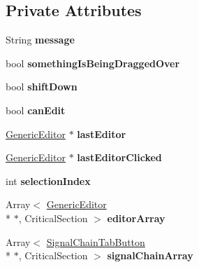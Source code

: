 \subsection*{Private Attributes}
\begin{DoxyCompactItemize}
\item 
\hypertarget{classEditorViewport_aebcce72fe2d98eed5690cdea87bbd776}{String {\bfseries message}}\label{classEditorViewport_aebcce72fe2d98eed5690cdea87bbd776}

\item 
\hypertarget{classEditorViewport_a152689484821c227a7909c6087b41e6c}{bool {\bfseries something\-Is\-Being\-Dragged\-Over}}\label{classEditorViewport_a152689484821c227a7909c6087b41e6c}

\item 
\hypertarget{classEditorViewport_a04fad22528a1dd4d5d68fd6cec4d0dd4}{bool {\bfseries shift\-Down}}\label{classEditorViewport_a04fad22528a1dd4d5d68fd6cec4d0dd4}

\item 
\hypertarget{classEditorViewport_ada0e62d14a51a7ffda1e396a5b66061c}{bool {\bfseries can\-Edit}}\label{classEditorViewport_ada0e62d14a51a7ffda1e396a5b66061c}

\item 
\hypertarget{classEditorViewport_aa4e7f71ad4823d393a489853d2760ba8}{\hyperlink{classGenericEditor}{Generic\-Editor} $\ast$ {\bfseries last\-Editor}}\label{classEditorViewport_aa4e7f71ad4823d393a489853d2760ba8}

\item 
\hypertarget{classEditorViewport_a7964a4d304213a3d5a40c3f7ea48257e}{\hyperlink{classGenericEditor}{Generic\-Editor} $\ast$ {\bfseries last\-Editor\-Clicked}}\label{classEditorViewport_a7964a4d304213a3d5a40c3f7ea48257e}

\item 
\hypertarget{classEditorViewport_a4b8c16b1db82e6f7949be357ee9ce644}{int {\bfseries selection\-Index}}\label{classEditorViewport_a4b8c16b1db82e6f7949be357ee9ce644}

\item 
\hypertarget{classEditorViewport_afb84ce94749157028397417b95b70aba}{Array$<$ \hyperlink{classGenericEditor}{Generic\-Editor} \\*
$\ast$, Critical\-Section $>$ {\bfseries editor\-Array}}\label{classEditorViewport_afb84ce94749157028397417b95b70aba}

\item 
\hypertarget{classEditorViewport_a1f7e1003e9ad42e10eb6154a756735ec}{Array$<$ \hyperlink{classSignalChainTabButton}{Signal\-Chain\-Tab\-Button} \\*
$\ast$, Critical\-Section $>$ {\bfseries signal\-Chain\-Array}}\label{classEditorViewport_a1f7e1003e9ad42e10eb6154a756735ec}


\end{DoxyCompactItemize}
